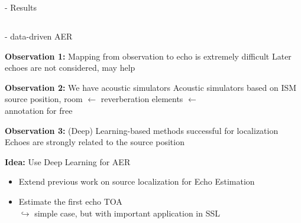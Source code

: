 \begin{frame}{\blaster - Results}

\end{frame}

\subsection{\lantern}

\begin{frame}{\lantern - data-driven AER}

    \begin{block}{\textbf{Observation 1:} Mapping from observation to echo is extremely difficult}
        Later echoes are not considered, may help
    \end{block}

    \begin{block}{\textbf{Observation 2:} We have acoustic simulators}
        Acoustic simulators based on ISM
        \\source position, room $\leftarrow$ reverberation elements $\leftarrow$
        \\annotation for free
    \end{block}

    \begin{block}{\textbf{Observation 3:} (Deep) Learning-based methods successful for localization}
        Echoes are strongly related to the source position
    \end{block}

    \begin{alertblock}{\textbf{Idea:} Use Deep Learning for AER}
        \begin{itemize}
            \item Extend previous work on source localization for Echo Estimation
            \item Estimate the first echo TOA
            \\$\hookrightarrow$ simple case, but with important application in SSL
        \end{itemize}
    \end{alertblock}

\end{frame}

